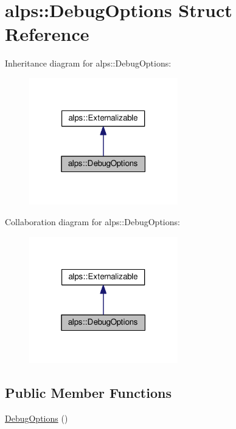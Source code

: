 \hypertarget{structalps_1_1DebugOptions}{}\section{alps\+:\+:Debug\+Options Struct Reference}
\label{structalps_1_1DebugOptions}


Inheritance diagram for alps\+:\+:Debug\+Options\+:
\nopagebreak
\begin{figure}[H]
\begin{center}
\leavevmode
\includegraphics[width=183pt]{structalps_1_1DebugOptions__inherit__graph}
\end{center}
\end{figure}


Collaboration diagram for alps\+:\+:Debug\+Options\+:
\nopagebreak
\begin{figure}[H]
\begin{center}
\leavevmode
\includegraphics[width=183pt]{structalps_1_1DebugOptions__coll__graph}
\end{center}
\end{figure}
\subsection*{Public Member Functions}
\begin{DoxyCompactItemize}
\item 
\hyperlink{structalps_1_1DebugOptions_ac80b967acde2e4b8bf67efea07c2daff}{Debug\+Options} ()
\end{DoxyCompactItemize}
